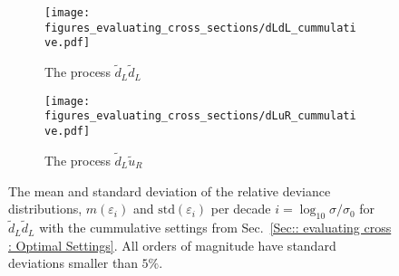 \documentclass[twoside,english]{uiofysmaster}
\begin{document}
{\begin{figure}
    \centering
    \begin{subfigure}[b]{0.6\textwidth}
        \texttt{[image: figures\_evaluating\_cross\_sections/dLdL\_cummulative.pdf]}
        \caption{The process $\widetilde{d}_L \widetilde{d}_L$}
        \label{Fig:: evaluating cross : RD cummulative dLdL}
    \end{subfigure}
    \begin{subfigure}[b]{0.6\textwidth}
        \texttt{[image: figures\_evaluating\_cross\_sections/dLuR\_cummulative.pdf]}
        \caption{The process $\widetilde{d}_L \widetilde{u}_R$}
        \label{Fig:: evaluating cross : RD cummulative dLuR}
    \end{subfigure}
    \caption{The mean and standard deviation of the relative deviance distributions, $m(\varepsilon_i)$ and $\mathrm{std}(\varepsilon_i)$ per decade $i = \log_{10} \sigma/\sigma_0$ for $\widetilde{d}_L \widetilde{d}_L$ with the cummulative settings from Sec.~\ref{Sec:: evaluating cross : Optimal Settings}. All orders of magnitude have standard deviations smaller than $5\%$.}
\label{Fig:: evaluating cross : RD cummulative dLdL dLuR}
\end{figure}




}
\end{document}
